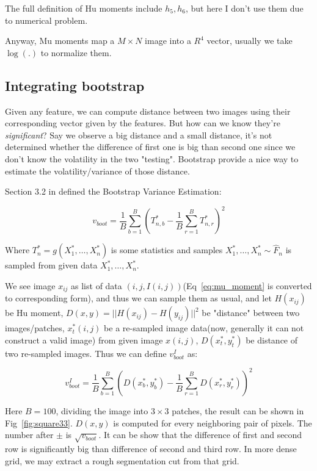 \documentclass{article}
\begin{document}
The full definition of Hu moments include $h_5,h_6$, but here I don't use them due to
numerical problem. 

Anyway, Mu moments map a $M \times N$ image into a $R^4$ vector, usually we take $\log(.)$ to normalize them.

\subsection{Integrating bootstrap}

Given any feature, we can compute distance between two images using their corresponding vector given by the features. But how can we know
they're \textit{significant}? Say we observe a big distance and a small distance, it's not determined whether the difference of first one is 
big than second one since we don't know the volatility in the two "testing". Bootstrap provide a nice way to estimate the volatility/variance
of those distance.

Section 3.2 in \cite{wasserman2006all} defined the Bootstrap Variance Estimation:

$$
v_{boot} = \frac{1}{B} \sum_{b=1}^B \left( T^*_{n,b} - \frac{1}{B}\sum_{r=1}^B T^*_{n,r} \right)^2
$$

Where $T_n^*=g(X_1^*,\dots,X_n^*)$ is some statistics and samples $X_1^*,\dots,X_n^* \sim \hat{F}_n$ is sampled from given data $X_1^*,\dots,X_n^*$.

We see image $x_{ij}$ as list of data $(i,j,I(i,j))$(Eq~\ref{eq:mu_moment} is converted to corresponding form), and thus we can sample them as usual,
and let $H(x_{ij})$ be Hu moment, $D(x,y)=||H(x_{ij}) - H(y_{ij})||^2$ be "distance" between two images/patches, $x_t^*(i,j)$ be a re-sampled
image data(now, generally it can not construct a valid image) from given image $x(i,j)$, $D(x_t^*,y_t^*)$ be distance of two re-sampled images. Thus we can define $v_{boot}^I$ as:

$$
v_{boot}^I = \frac{1}{B}\sum_{b=1}^B \left( D(x_b^*,y_b^*) - \frac{1}{B} \sum_{r=1}^B D(x_r^*,y_r^*) \right)^2
$$

Here $B=100$, dividing the image into $3 \times 3$ patches, the result can be shown in Fig~\ref{fig:square33}. 
$D(x,y)$ is computed for every neighboring pair of pixels. The number after $\pm$ is $\sqrt{v_{boot}}$. It can be show that
the difference of first and second row is significantly big than difference of second and third row. In more dense grid,
we may extract a rough segmentation cut from that grid.
\end{document}
